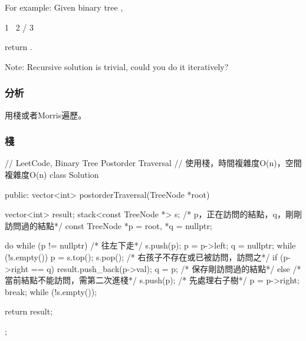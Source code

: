 For example:
Given binary tree ,
\begin{Code}
 1
  \
   2
  /
 3
\end{Code}
return \code{\[3,2,1\]}.

Note: Recursive solution is trivial, could you do it iteratively?


\subsubsection{分析}
用棧或者Morris遍歷。


\subsubsection{棧}
\begin{Code}
// LeetCode, Binary Tree Postorder Traversal
// 使用棧，時間複雜度O(n)，空間複雜度O(n)
class Solution {
public:
    vector<int> postorderTraversal(TreeNode *root) {
        vector<int> result;
        stack<const TreeNode *> s;
        /* p，正在訪問的結點，q，剛剛訪問過的結點*/
        const TreeNode *p = root, *q = nullptr;

        do {
            while (p != nullptr) { /* 往左下走*/
                s.push(p);
                p = p->left;
            }
            q = nullptr;
            while (!s.empty()) {
                p = s.top();
                s.pop();
                /* 右孩子不存在或已被訪問，訪問之*/
                if (p->right == q) {
                    result.push_back(p->val);
                    q = p; /* 保存剛訪問過的結點*/
                } else {
                    /* 當前結點不能訪問，需第二次進棧*/
                    s.push(p);
                    /* 先處理右子樹*/
                    p = p->right;
                    break;
                }
            }
        } while (!s.empty());

        return result;
    }
};
\end{Code}


